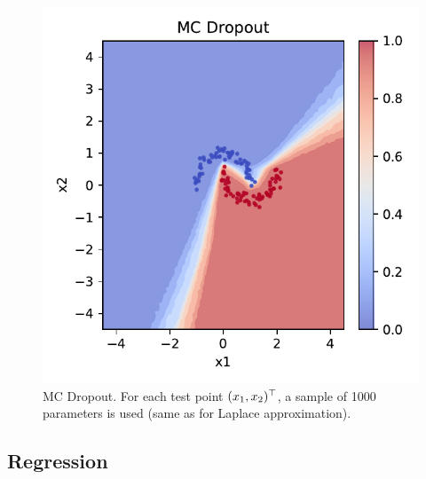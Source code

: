 \begin{figure}[tb]
  \centering
  \includegraphics{images/classif_mc_dropout.pdf}
  \caption{MC Dropout. For each test point $(x_1, x_2)^\top$, a sample of 1000 parameters is used (same as for Laplace approximation).}
  \label{fig:classif-mcd}
\end{figure}

\subsection{Regression}

